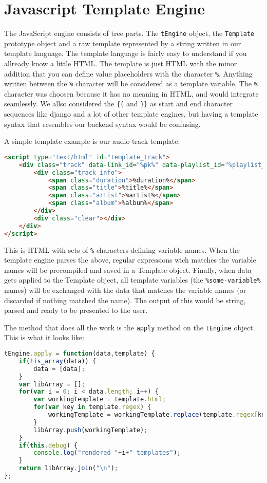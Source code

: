 \section{Javascript Template Engine}

The JavaScript engine consists of tree parts. The 
\lstinline$tEngine$ object, the \lstinline$Template$ prototype object 
and a raw template represented by a string written in our template language. 
The template language is fairly easy to understand if you allready know a little HTML. 
The template is just HTML with the minor addition that you can define value placeholders with the character \verb$%$. 
Anything written between the \verb$%$ character will be considered as a template variable. 
The \verb$%$ character was choosen because it has no meaning in HTML, and would integrate seamlessly. 
We allso considered the \verb${{$ and \verb$}}$ as start and end character 
sequences like django and a lot of other template engines, 
but having a template syntax that resembles our backend syntax would be confusing.

A simple template example is our audio track template:

\begin{lstlisting}[language=HTML,caption=The template used to represent audio tracks]
<script type="text/html" id="template_track">
	<div class="track" data-link_id="%pk%" data-playlist_id="%playlist_id%" data-path="%path%">
		<div class="track_info">
			<span class="duration">%duration%</span>
			<span class="title">%title%</span>
			<span class="artist">%artist%</span>
			<span class="album">%album%</span>
		</div>
		<div class="clear"></div>
	</div>
</script>
\end{lstlisting}

This is HTML with sets of \verb$%$ characters defining variable names. 
When the template engine parses the above, regular expressions wich matches the variable names will be precompiled and saved in a Template object. 
Finally, when data gets applied to the Template object, 
all template variables (the \verb$%some-variable%$ names) will be exchanged with 
the data that matches the variable names (or discarded if nothing matched the name).
The output of this would be string, parsed and ready to be presented to the user.


The method that does all the work is the \verb$apply$ method on the \verb$tEngine$ object. This is what it looks like:
\begin{lstlisting}[language=JavaScript,caption=The javascript engine apply method]
tEngine.apply = function(data,template) {
    if(!is_array(data)) {
        data = [data];
    }
    var libArray = [];
    for(var i = 0; i < data.length; i++) {
        var workingTemplate = template.html;
        for(var key in template.regex) {
            workingTemplate = workingTemplate.replace(template.regex[key],data[i][key]);
        }
        libArray.push(workingTemplate);
    }
	if(this.debug) {
		console.log("rendered "+i+" templates");
	}
    return libArray.join("\n");
};
\end{lstlisting}

